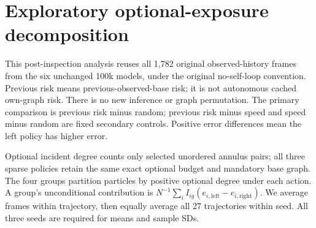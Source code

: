 \section{Exploratory optional-exposure decomposition}
\label{sec:optional-exposure}
This post-inspection analysis reuses all 1,782 original observed-history frames
from the six unchanged 100k models, under the original no-self-loop convention.
Previous risk means previous-observed-base risk; it is not autonomous cached
own-graph risk. There is no new inference or graph permutation. The primary
comparison is previous risk minus random; previous risk minus speed and speed
minus random are fixed secondary controls. Positive error differences mean
the left policy has higher error.

Optional incident degree counts only selected unordered annulus pairs; all
three sparse policies retain the same exact optional budget and mandatory
base graph. The four groups partition particles by positive optional degree
under each action. A group's unconditional contribution is
$N^{-1}\sum_i I_{ig}(e_{i,\mathrm{left}}-e_{i,\mathrm{right}})$.
We average frames within trajectory, then equally average all 27 trajectories
within seed. All three seeds are required for means and sample SDs.


